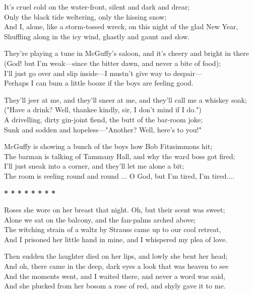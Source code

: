 
\begin{poemblock}
It's cruel cold on the water-front, silent and dark and drear;\\
\idt Only the black tide weltering, only the hissing snow;\\
And I, alone, like a storm-tossed wreck, on this night of the glad New Year,\\
\idt Shuffling along in the icy wind, ghastly and gaunt and slow.

They're playing a tune in McGuffy's saloon, and it's cheery and bright in there\\
\idt (God! but I'm weak—since the bitter dawn, and never a bite of food);\\
I'll just go over and slip inside—I mustn't give way to despair—\\
\idt Perhaps I can bum a little booze if the boys are feeling good.

They'll jeer at me, and they'll sneer at me, and they'll call me a whiskey soak;\\
\idt ("Have a drink? Well, thankee kindly, sir, I don't mind if I do.")\\
A drivelling, dirty gin-joint fiend, the butt of the bar-room joke;\\
\idt Sunk and sodden and hopeless—"Another? Well, here's to you!"

McGuffy is showing a bunch of the boys how Bob Fitzsimmons hit;\\
\idt The barman is talking of Tammany Hall, and why the ward boss got fired;\\
I'll just sneak into a corner, and they'll let me alone a bit;\\
\idt The room is reeling round and round ... O God, but I'm tired, I'm tired....

\centerline{\textbf{*   *   *   *   *   *   *   *}}

Roses she wore on her breast that night. Oh, but their scent was sweet;\\
\idt Alone we sat on the balcony, and the fan-palms arched above;\\
The witching strain of a waltz by Strauss came up to our cool retreat,\\
\idt And I prisoned her little hand in mine, and I whispered my plea of love.

Then sudden the laughter died on her lips, and lowly she bent her head;\\
\idt And oh, there came in the deep, dark eyes a look that was heaven to see\\
And the moments went, and I waited there, and never a word was said,\\
\idt And she plucked from her bosom a rose of red, and shyly gave it to me.


\end{poemblock}

